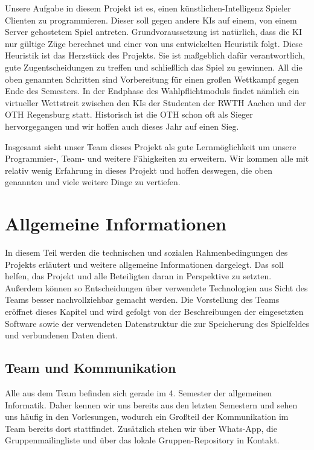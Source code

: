 \documentclass[12pt,a4paper,bibliography=totocnumbered,listof=totocnumbered]{scrartcl}
\begin{document}
    Unsere Aufgabe in diesem Projekt ist es, einen künstlichen-Intelligenz Spieler Clienten zu programmieren. Dieser soll gegen andere KIs auf einem, von einem Server gehostetem Spiel antreten. Grundvoraussetzung ist natürlich, dass die KI nur gültige Züge berechnet und einer von uns entwickelten Heuristik folgt. Diese Heuristik ist das Herzstück des Projekts. Sie ist maßgeblich dafür verantwortlich, gute Zugentscheidungen zu treffen und schließlich das Spiel zu gewinnen. All die oben genannten Schritten sind Vorbereitung für einen großen Wettkampf gegen Ende des Semesters. In der Endphase des Wahlpflichtmoduls findet nämlich ein virtueller Wettstreit zwischen den KIs der Studenten der RWTH Aachen und der OTH Regensburg statt. Historisch ist die OTH schon oft als Sieger hervorgegangen und wir hoffen auch dieses Jahr auf einen Sieg.

    Insgesamt sieht unser Team dieses Projekt als gute Lernmöglichkeit um unsere Programmier-, Team- und weitere Fähigkeiten zu erweitern. Wir kommen alle mit relativ wenig Erfahrung in dieses Projekt und hoffen deswegen, die oben genannten und viele weitere Dinge zu vertiefen.

	\newpage

    \section{Allgemeine Informationen}
    \vspace{1em}

    In diesem Teil werden die technischen und sozialen Rahmenbedingungen des Projekts erläutert und weitere allgemeine Informationen dargelegt. Das soll helfen, das Projekt und alle Beteiligten daran in Perspektive zu setzten. Außerdem können so Entscheidungen über verwendete Technologien aus Sicht des Teams besser nachvollziehbar gemacht werden. Die Vorstellung des Teams eröffnet dieses Kapitel und wird gefolgt von der Beschreibungen der eingesetzten Software sowie der verwendeten Datenstruktur die zur Speicherung des Spielfeldes und verbundenen Daten dient.

    \subsection{Team und Kommunikation}
    \vspace{1em}
    Alle aus dem Team befinden sich gerade im 4. Semester der allgemeinen Informatik. Daher kennen wir uns bereits aus den letzten Semestern und sehen uns häufig in den Vorlesungen, wodurch ein Großteil der Kommunikation im Team bereits dort stattfindet. Zusätzlich stehen wir über Whats-App, die Gruppenmailingliste und über das lokale Gruppen-Repository in Kontakt.
\end{document}
